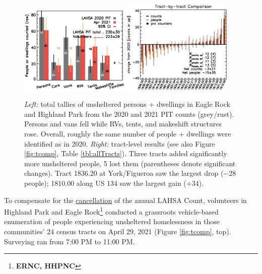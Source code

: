 \documentclass[11pt]{article}
\def\bfr{\bf\color{red}}
\begin{document}
\begin{figure}[h]
	\centering
	\includegraphics[width = 0.47\textwidth, trim = 1cm 0cm 0cm 1cm]{bars}
	\includegraphics[width = 0.47\textwidth, trim = 0cm 0cm 0cm 1cm]{tractsYrYr.eps}	
	\caption{{\it Left:} total tallies of unsheltered persons + dwellings in Eagle Rock and
			Highland Park from the 2020 and 2021 PIT counts (grey/rust). Persons and vans 
			fell while RVs, tents, and makeshift structures rose. Overall, roughly the same number 
			of people + dwellings were identified as in 2020. {\it Right:} tract-level
			results (see also Figure \ref{fig:tcomp}, Table \ref{tbl:allTracts}). Three tracts added 
			significantly more unsheltered people, 5 lost them (parentheses
			denote significant changes). Tract 1836.20 at York/Figueroa saw the largest 
			drop ($-28$ people); 1810.00 along US 134 saw the largest gain ($+34$).}
	\label{fig:rawCounts}
\end{figure}


 To compensate for the 
\href{https://laist.com/latest/post/20201209/LAHSA-cancels-2021-homeless-count-los-angeles-covid-19}
{cancellation} of the annual LAHSA Count, volunteers in Highland Park and Eagle 
Rock\footnote{{\bfr ERNC, HHPNC}} conducted a grassroots vehicle-based enumeration of people 
experiencing unsheltered homelessness in those communities' 24 census tracts on April 29, 2021 
(Figure \ref{fig:tcomp}, top). Surveying ran from 7:00 PM to 11:00 PM.\\
\end{document}
